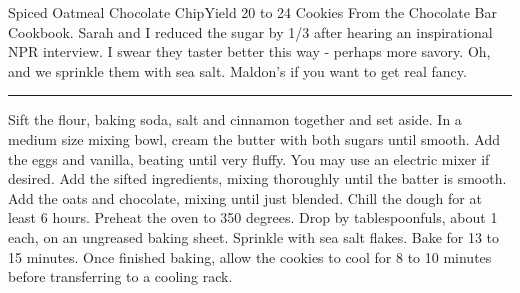 \begin{recipe}{Spiced Oatmeal Chocolate Chip}{Yield 20 to 24 Cookies}{}
\freeform
From the Chocolate Bar Cookbook. Sarah and I reduced the sugar by 1/3
after hearing an inspirational NPR interview. I swear they taster
better this way - perhaps more savory. Oh, and we sprinkle them with
sea salt. Maldon's if you want to get real fancy.\\
\rule{\textwidth}{0.05pt}
Sift the flour, baking soda, salt and cinnamon together and set aside.
In a medium size mixing bowl, cream the butter with both sugars until
smooth.
Add the eggs and vanilla, beating until very fluffy. You may use an
electric mixer if desired.
Add the sifted ingredients, mixing thoroughly until the batter is
smooth. Add the oats and chocolate, mixing until just blended. Chill
the dough for at least 6 hours.
\freeform
Preheat the oven to 350 degrees. Drop by tablespoonfuls, about 1
each, on an ungreased baking sheet. Sprinkle with sea salt
flakes. Bake for 13 to 15 minutes. Once finished baking, allow the
cookies to cool for 8 to 10 minutes before transferring to a cooling
rack.
\end{recipe}